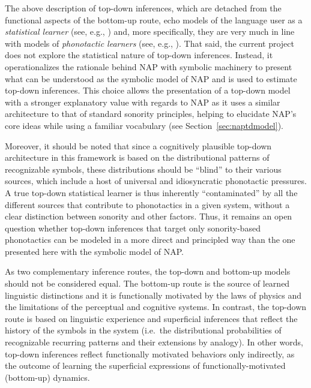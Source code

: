 The above description of top-down inferences, which are detached from the functional aspects of the bottom-up route, echo models of the language user as a \emph{statistical learner} (see, e.g., \citealt{christiansen1999power, frisch2001psychologicalsk, tremblay2013processing})
and, more specifically, they are very much in line with models of \emph{phonotactic learners} (see, e.g., \citealt{coleman1997stochastic, albright2009feature, bailey2001determinants, daland2011explaining, hayes2011interpreting, hayes2008maximum, jarosz2017inputsk, mayer2019phonotacticsk, vitevitch2004webbasedsk}).
That said, the current project does not explore the statistical nature of top-down inferences. Instead, it operationalizes the rationale behind NAP with symbolic machinery to present what can be understood as the symbolic model of NAP and is used to estimate top-down inferences.
This choice allows the presentation of a top-down model with a stronger explanatory value with regards to NAP as it uses a similar architecture to that of standard sonority principles, helping to elucidate NAP's core ideas while using a familiar vocabulary (see Section~\ref{sec:naptdmodel}).

Moreover, it should be noted that since a cognitively plausible top-down architecture in this framework is based on the distributional patterns of recognizable symbols, these distributions should be \enquote{blind} to their various sources, which include a host of universal and idiosyncratic phonotactic pressures. A true top-down statistical learner is thus inherently \enquote{contaminated} by all the different sources that contribute to phonotactics in a given system, without a clear distinction between sonority and other factors. Thus, it remains an open question whether top-down inferences that target only sonority-based phonotactics can be modeled in a more direct and principled way than the one presented here with the symbolic model of NAP.

As two complementary inference routes, the top-down and bottom-up models should not be considered equal. The bottom-up route is the source of learned linguistic distinctions and it is functionally motivated by the laws of physics and the limitations of the perceptual and cognitive systems.
In contrast, the top-down route is based on linguistic experience and superficial inferences that reflect the history of the symbols in the system (i.e.~the distributional probabilities of recognizable recurring patterns and their extensions by analogy). In other words, top-down inferences reflect functionally motivated behaviors only indirectly, as the outcome of learning the superficial expressions of functionally-motivated (bottom-up) dynamics.

